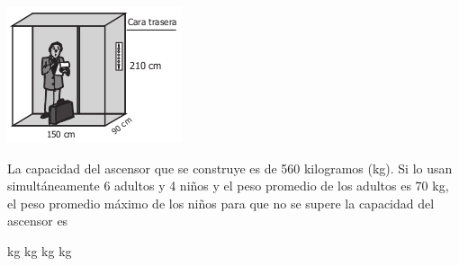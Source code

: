 \documentclass[10pt,addpoints]{exam}
\begin{document}
\begin{questions}
\begin{center}
\includegraphics[scale=.8]{Images/Pantallazo-40.png} 
\end{center}
La capacidad del ascensor que se construye es de 560 kilogramos (kg). Si lo usan simultáneamente 6 adultos y 4 niños y el peso promedio de los adultos es 70 kg, el peso promedio máximo de los niños para que no se supere la capacidad del ascensor es

\begin{oneparchoices}
 kg
 kg
 kg
 kg
\end{oneparchoices}
\end{questions}
\end{document}
